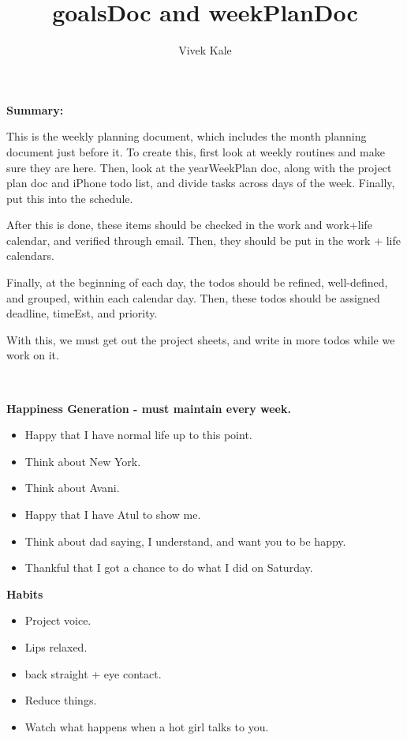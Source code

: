 \documentclass[11pt]{article}
\title{goalsDoc and weekPlanDoc}
\author{Vivek Kale}
\begin{document}
\maketitle  

\textbf{Summary:} {\small This is the weekly planning document, which includes 
the month planning document just before it. 
To create this, first look at weekly routines and make sure they are here. Then,
look at the yearWeekPlan doc, along with the project plan doc and iPhone
todo list, and divide tasks across days of the week. Finally, put this
into the schedule. 

After this is done, these items should be checked in the work and
work+life calendar, and verified through email. 
Then, they should be put in the work + life
calendars.

Finally, at the beginning of each day, the todos should be refined,
well-defined, and grouped, within each calendar day. Then, these todos
should be assigned deadline, timeEst, and priority. 

With this, we must get out the project sheets, and write in more todos
while we work on it. 
}\\ 

\newpage 


\textbf{Happiness Generation - must maintain every week.}
\begin{itemize}
  \tiny \item \tiny Happy that I have normal life up to this point.
  \item \tiny Think about New York. 
  \item \tiny Think about Avani. 
  \item \tiny Happy that I have Atul to show me.
  \item \tiny Think about dad saying, I understand, and want you to be happy. 
  \item \tiny Thankful that I got a chance to do what I did on Saturday. 
\end{itemize} 

\textbf{Habits}
\begin{itemize}
\item \tiny Project voice. 
\item \tiny Lips relaxed.
  \tiny \item \tiny back straight + eye contact.
\item \tiny Reduce things.
\item \tiny Watch what happens when a hot girl talks to you.
\end{itemize} 
\end{document}

